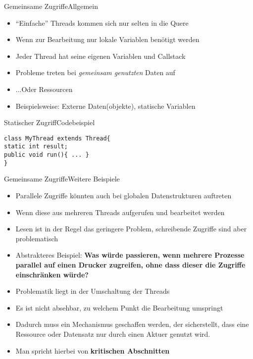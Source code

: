 \begin{frame}{Gemeinsame Zugriffe}{Allgemein}
    \begin{itemize}
        \item "`Einfache"' Threads kommen sich nur selten in die Quere
        \item Wenn zur Bearbeitung nur lokale Variablen benötigt werden
        \item Jeder Thread hat seine eigenen Variablen und Callstack
        \item Probleme treten bei \textit{gemeinsam genutzten} Daten auf
        \item ...Oder Ressourcen
        \item Beispielsweise: Externe Daten(objekte), statische Variablen
    \end{itemize}
\end{frame}

\begin{frame}[fragile]{Statischer Zugriff}{Codebeispiel}
\lstset{style=java}
\begin{lstlisting}
class MyThread extends Thread{
static int result;
public void run(){ ... }
}
\end{lstlisting}
\end{frame}

\begin{frame}{Gemeinsame Zugriffe}{Weitere Beispiele}
    \begin{itemize}
        \item Parallele Zugriffe könnten auch bei globalen Datenstrukturen auftreten
        \item Wenn diese aus mehreren Threads aufgerufen und bearbeitet werden
        \item Lesen ist in der Regel das geringere Problem, schreibende Zugriffe sind aber problematisch
        \item Abstrakteres Beispiel: \textbf{Was würde passieren, wenn mehrere Prozesse parallel auf einen Drucker zugreifen, ohne dass dieser die Zugriffe einschränken würde?}
        \item Problematik liegt in der Umschaltung der Threads
        \item Es ist nicht absehbar, zu welchem Punkt die Bearbeitung umspringt
        \item Dadurch muss ein Mechanismus geschaffen werden, der sicherstellt, dass eine Ressource oder Datensatz nur durch einen Aktuer genutzt wird.
        \item Man spricht hierbei von \textbf{kritischen Abschnitten}
    \end{itemize}
\end{frame}

